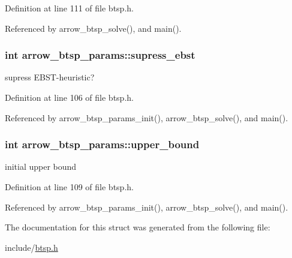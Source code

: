 Definition at line 111 of file btsp.h.

Referenced by arrow\_\-btsp\_\-solve(), and main().\hypertarget{structarrow__btsp__params_cd85b850ac7c8495a4689100e8c3182c}{
\subsubsection[{supress\_\-ebst}]{\setlength{\rightskip}{0pt plus 5cm}int {\bf arrow\_\-btsp\_\-params::supress\_\-ebst}}}
\label{structarrow__btsp__params_cd85b850ac7c8495a4689100e8c3182c}


supress EBST-heuristic? 

Definition at line 106 of file btsp.h.

Referenced by arrow\_\-btsp\_\-params\_\-init(), arrow\_\-btsp\_\-solve(), and main().\hypertarget{structarrow__btsp__params_b8749004215015a78139b8e4e1fb8905}{
\subsubsection[{upper\_\-bound}]{\setlength{\rightskip}{0pt plus 5cm}int {\bf arrow\_\-btsp\_\-params::upper\_\-bound}}}
\label{structarrow__btsp__params_b8749004215015a78139b8e4e1fb8905}


initial upper bound 

Definition at line 109 of file btsp.h.

Referenced by arrow\_\-btsp\_\-params\_\-init(), arrow\_\-btsp\_\-solve(), and main().

The documentation for this struct was generated from the following file:\begin{CompactItemize}
\item 
include/\hyperlink{btsp_8h}{btsp.h}\end{CompactItemize}
